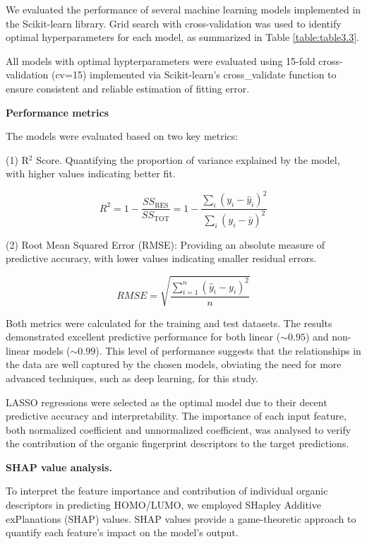 We evaluated the performance of several machine learning models implemented in the Scikit-learn library. Grid search with cross-validation was used to identify optimal hyperparameters for each model, as summarized in Table \ref{table:table3.3}.

All models with optimal hypterparameters were evaluated using 15-fold cross-validation (cv=15) implemented via Scikit-learn’s cross\_validate function to ensure consistent and reliable estimation of fitting error.

\textbf{Performance metrics}

The models were evaluated based on two key metrics: 

(1) R$^2$ Score. Quantifying the proportion of variance explained by the model, with higher values indicating better fit.

\begin{equation}
    R^2 = 1 - \frac{SS_{\text{RES}}}{SS_{\text{TOT}}} = 1 - \frac{\sum_i (y_i - \hat{y}_i)^2}{\sum_i (y_i - \bar{y})^2}
\end{equation}

(2) Root Mean Squared Error (RMSE): Providing an absolute measure of predictive accuracy, with lower values indicating smaller residual errors.

\begin{equation}
RMSE = \sqrt{\frac{\sum\limits_{i=1}^{n} (\hat{y}_i - y_i)^2}{n}}
\end{equation}

Both metrics were calculated for the training and test datasets. The results demonstrated excellent predictive performance for both linear ($\sim0.95$) and non-linear models ($\sim0.99$). This level of performance suggests that the relationships in the data are well captured by the chosen models, obviating the need for more advanced techniques, such as deep learning, for this study.

LASSO regressions were selected as the optimal model due to their decent predictive accuracy and interpretability. The importance of each input feature, both normalized coefficient and unnormalized coefficient, was analysed to verify the contribution of the organic fingerprint descriptors to the target predictions.

\textbf{SHAP value analysis.}


To interpret the feature importance and contribution of individual organic descriptors in predicting HOMO/LUMO, we employed SHapley Additive exPlanations (SHAP) values. SHAP values provide a game-theoretic approach to quantify each feature’s impact on the model’s output.

